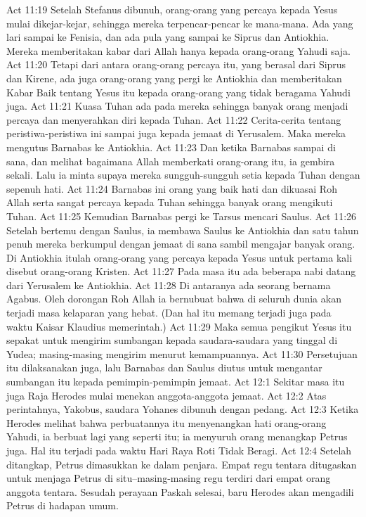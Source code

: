 Act 11:19  Setelah Stefanus dibunuh, orang-orang yang percaya kepada Yesus mulai dikejar-kejar, sehingga mereka terpencar-pencar ke mana-mana. Ada yang lari sampai ke Fenisia, dan ada pula yang sampai ke Siprus dan Antiokhia. Mereka memberitakan kabar dari Allah hanya kepada orang-orang Yahudi saja.
Act 11:20  Tetapi dari antara orang-orang percaya itu, yang berasal dari Siprus dan Kirene, ada juga orang-orang yang pergi ke Antiokhia dan memberitakan Kabar Baik tentang Yesus itu kepada orang-orang yang tidak beragama Yahudi juga.
Act 11:21  Kuasa Tuhan ada pada mereka sehingga banyak orang menjadi percaya dan menyerahkan diri kepada Tuhan.
Act 11:22  Cerita-cerita tentang peristiwa-peristiwa ini sampai juga kepada jemaat di Yerusalem. Maka mereka mengutus Barnabas ke Antiokhia.
Act 11:23  Dan ketika Barnabas sampai di sana, dan melihat bagaimana Allah memberkati orang-orang itu, ia gembira sekali. Lalu ia minta supaya mereka sungguh-sungguh setia kepada Tuhan dengan sepenuh hati.
Act 11:24  Barnabas ini orang yang baik hati dan dikuasai Roh Allah serta sangat percaya kepada Tuhan sehingga banyak orang mengikuti Tuhan.
Act 11:25  Kemudian Barnabas pergi ke Tarsus mencari Saulus.
Act 11:26  Setelah bertemu dengan Saulus, ia membawa Saulus ke Antiokhia dan satu tahun penuh mereka berkumpul dengan jemaat di sana sambil mengajar banyak orang. Di Antiokhia itulah orang-orang yang percaya kepada Yesus untuk pertama kali disebut orang-orang Kristen.
Act 11:27  Pada masa itu ada beberapa nabi datang dari Yerusalem ke Antiokhia.
Act 11:28  Di antaranya ada seorang bernama Agabus. Oleh dorongan Roh Allah ia bernubuat bahwa di seluruh dunia akan terjadi masa kelaparan yang hebat. (Dan hal itu memang terjadi juga pada waktu Kaisar Klaudius memerintah.)
Act 11:29  Maka semua pengikut Yesus itu sepakat untuk mengirim sumbangan kepada saudara-saudara yang tinggal di Yudea; masing-masing mengirim menurut kemampuannya.
Act 11:30  Persetujuan itu dilaksanakan juga, lalu Barnabas dan Saulus diutus untuk mengantar sumbangan itu kepada pemimpin-pemimpin jemaat.
Act 12:1  Sekitar masa itu juga Raja Herodes mulai menekan anggota-anggota jemaat.
Act 12:2  Atas perintahnya, Yakobus, saudara Yohanes dibunuh dengan pedang.
Act 12:3  Ketika Herodes melihat bahwa perbuatannya itu menyenangkan hati orang-orang Yahudi, ia berbuat lagi yang seperti itu; ia menyuruh orang menangkap Petrus juga. Hal itu terjadi pada waktu Hari Raya Roti Tidak Beragi.
Act 12:4  Setelah ditangkap, Petrus dimasukkan ke dalam penjara. Empat regu tentara ditugaskan untuk menjaga Petrus di situ--masing-masing regu terdiri dari empat orang anggota tentara. Sesudah perayaan Paskah selesai, baru Herodes akan mengadili Petrus di hadapan umum.
